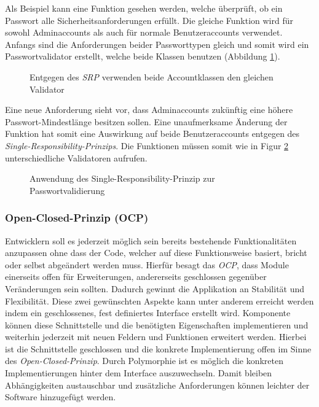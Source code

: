 \documentclass[conference]{IEEEtran}
\begin{document}
Als Beispiel kann eine Funktion gesehen werden, welche überprüft, ob ein Passwort alle Sicherheitsanforderungen erfüllt. Die gleiche Funktion wird für sowohl Adminaccounts als auch für normale Benutzeraccounts verwendet. Anfangs sind die Anforderungen beider Passworttypen gleich und somit wird ein Passwortvalidator erstellt, welche beide Klassen benutzen (Abbildung \ref{fig:VorSRP}).

\begin{figure}[htbp]
	\small
	
	\caption{Entgegen des \emph{SRP} verwenden beide Accountklassen den gleichen Validator}
	\label{fig:VorSRP}
\end{figure}


Eine neue Anforderung sieht vor, dass Adminaccounts zukünftig eine höhere Passwort-Mindestlänge besitzen sollen. Eine unaufmerksame Änderung der Funktion hat somit eine Auswirkung auf beide Benutzeraccounts entgegen des \emph{Single-Responsibility-Prinzips}. Die Funktionen müssen somit wie in Figur \ref{fig:NachSRP} unterschiedliche Validatoren aufrufen. 

\begin{figure}[htbp]
	\small
	
	\caption{Anwendung des Single-Responsibility-Prinzip zur Passwortvalidierung}
	\label{fig:NachSRP}
\end{figure}



\subsubsection{Open-Closed-Prinzip (OCP)} Entwicklern soll es jederzeit möglich sein bereits bestehende Funktionalitäten anzupassen ohne dass der Code, welcher auf diese Funktionsweise basiert, bricht oder selbst abgeändert werden muss. Hierfür besagt das \emph{OCP}, dass Module einerseits offen für Erweiterungen, andererseits geschlossen gegenüber Veränderungen sein sollten. Dadurch gewinnt die Applikation an Stabilität und Flexibilität. Diese zwei gewünschten Aspekte kann unter anderem erreicht werden indem ein geschlossenes, fest definiertes Interface erstellt wird. Komponente können diese Schnittstelle und die benötigten Eigenschaften implementieren und weiterhin jederzeit mit neuen Feldern und Funktionen erweitert werden. Hierbei ist die Schnittstelle geschlossen und die konkrete Implementierung offen im Sinne des \emph{Open-Closed-Prinzip}. Durch Polymorphie ist es möglich die konkreten Implementierungen hinter dem Interface auszuwechseln. Damit bleiben Abhängigkeiten austauschbar und zusätzliche Anforderungen können leichter der Software hinzugefügt werden. \cite{Meyer.1993} \cite{Martin.2018}
 
\end{document}
